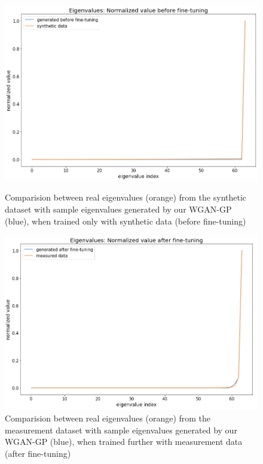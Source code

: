 \documentclass{article}
\begin{document}
\begin{figure}
    \centering
    \begin{minipage}{0.45\textwidth}
        \includegraphics[width=1.2\textwidth]{../figs/eval_WGANGP_sample_before_fine_tuning.png}
        \caption{Comparision between real eigenvalues (orange) from the synthetic dataset with sample eigenvalues generated by our WGAN-GP (blue), when trained only with synthetic data (before fine-tuning)}
        \label{fig:eval_WGANGP_sample_before_fine_tuning}
    \end{minipage}\hfill
    \begin{minipage}{0.45\textwidth}
        \includegraphics[width=1.2\textwidth]{../figs/eval_WGANGP_sample_after_fine_tuning.png}
        \caption{Comparision between real eigenvalues (orange) from the measurement dataset with sample eigenvalues generated by our WGAN-GP (blue), when trained further with measurement data (after fine-tuning)}
        \label{fig:eval_WGANGP_sample_after_fine_tuning}
    \end{minipage}
\end{figure}
\end{document}
